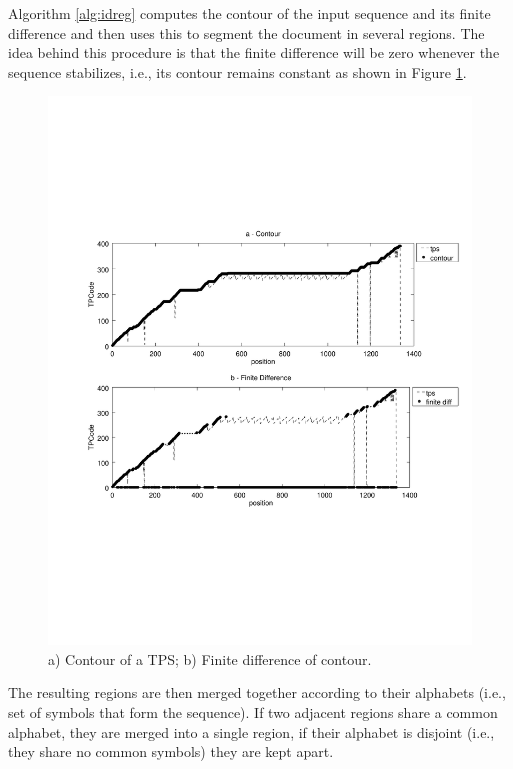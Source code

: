 \documentclass{vldb}
\begin{document}
Algorithm \ref{alg:idreg} computes the contour of the input sequence and its
finite difference and then uses this to segment the document in several regions.
The idea behind this procedure is that the finite difference will be zero
whenever the sequence stabilizes, i.e., its contour remains constant as shown in
Figure \ref{fig:contour}.

\begin{figure}[h]
  \centering
     \includegraphics[trim={2.5cm 7.5cm 1cm 6.5cm}, width=\linewidth
     ]{img/contour.pdf}
  \caption{a) Contour of a TPS; b) Finite difference of contour.}
  \label{fig:contour}
\end{figure}

The resulting regions are then merged together according to their alphabets
(i.e., set of symbols that form the sequence). If two adjacent regions share a
common alphabet, they are merged into a single region, if their alphabet is
disjoint (i.e., they share no common symbols) they are kept apart.
\end{document}

